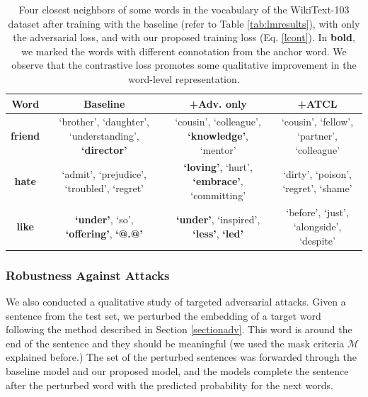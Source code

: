 \documentclass[letterpaper]{article} %
\begin{document}
\begin{table}[t]
\begin{center}
    \begin{tabular}{c|c|c|c}
    \hline
    \textbf{Word}   & \textbf{Baseline}      & \textbf{+Adv. only  }    & \textbf{+ATCL}    \\ \hline
    \textbf{friend} & \makecell{`brother', `daughter', \\ `understanding', \textbf{`director'}} & \makecell{`cousin', `colleague', \\ \textbf{`knowledge'}, `mentor'} & \makecell{`cousin', `fellow', \\ `partner', `colleague'} \\ \hline
    \textbf{hate}   & \makecell{`admit', `prejudice', \\ `troubled', `regret'} & \makecell{\textbf{`loving'}, `hurt', \\ \textbf{`embrace'}, `committing' } & \makecell{`dirty', `poison', \\ `regret', `shame'} \\ \hline
    \textbf{like }  & \makecell{\textbf{`under'}, `so', \\ \textbf{`offering'}, \textbf{`@.@'}} & \makecell{\textbf{`under'}, `inspired',\\ \textbf{`less'}, \textbf{`led'} } & \makecell{`before', `just', \\ `alongside', `despite' }  \\ \hline
    \end{tabular}
	\caption{Four closest neighbors of some words in the vocabulary of the WikiText-103 dataset after training with the baseline (refer to Table \ref{tab:lmresults}), with only the adversarial loss, and with our proposed training loss (Eq. \ref{lcont}). In \textbf{bold}, we marked the words with different connotation from the anchor word. We observe that the contrastive loss promotes some qualitative improvement in the word-level representation. }
    \label{tab:lmneigh}
\end{center}
\end{table}


\subsubsection{Robustness Against Attacks}

We also conducted a qualitative study of targeted adversarial attacks. Given a sentence from the test set, we perturbed the embedding of a target word following the method described in Section \ref{sectionadv}. This word is around the end of the sentence and they should be meaningful (we used the mask criteria $\mathcal{M}$ explained before.) 
The set of the perturbed sentences was forwarded through the baseline model and our proposed model, and the models complete the sentence after the perturbed word with the predicted probability for the next words. %
\end{document}
